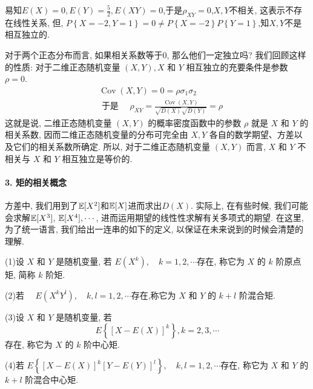 \begin{solution}
    易知$E\left(X\right) = 0,E\left(Y\right) = \frac{5}{2},E\left(X Y\right) = 0$,于是$\rho_{X Y} = 0$,$X,Y$不相关, 这表示不存在线性关系, 但, $P\left\{X = -2,Y = 1\right\} = 0 \neq P\left\{ X = -2\right\}P\left\{Y = 1\right\}$,知$X,Y$不是相互独立的. 
\end{solution}

\begin{example}
    对于两个正态分布而言, 如果相关系数等于0, 那么他们一定独立吗? 我们回顾这样的性质: 对于二维正态随机变量 $(X, Y), X$ 和 $Y$ 相互独立的充要条件是参数 $\rho=0$.$$
    \begin{aligned}
    & \operatorname{Cov}(X, Y)=0=\rho \sigma_1 \sigma_2 \\
    & \text { 于是 } \quad \rho_{X Y}=\frac{\operatorname{Cov}(X, Y)}{\sqrt{D(X)} \sqrt{D(Y)}}=\rho
    \end{aligned}
    $$
    这就是说, 二维正态随机变量 $(X, Y)$ 的概率密度函数中的参数 $\rho$ 就是 $X$ 和 $Y$ 的相关系数, 因而二维正态随机变量的分布可完全由 $X, Y$ 各自的数学期望、方差以及它们的相关系数所确定. 所以, 对于二维正态随机变量 $(X, Y)$ 而言, $X$ 和 $Y$ 不相关与 $X$ 和 $Y$ 相互独立是等价的. 
\end{example}

\paragraph{3. 矩的相关概念} 方差中, 我们用到了$\mathbb E[X^2]$和$\mathbb E[X]$进而求出$D(X)$. 实际上, 在有些时候, 我们可能会求解$\mathbb E[X^3]$, $\mathbb E[X^4],\cdots$, 进而运用期望的线性性求解有关多项式的期望. 在这里, 为了统一语言, 我们给出一连串的如下的定义, 以保证在未来说到的时候会清楚的理解. 

\begin{definition}

    (1)设 $X$ 和 $Y$ 是随机变量, 若
    $
    E\left(X^k\right), \quad k=1,2, \cdots
    $存在, 称它为 $X$ 的 $k$ 阶原点矩, 简称 $k$ 阶矩.

    (2)若 $\quad E\left(X^k Y^l\right), \quad k, l=1,2, \cdots$存在,称它为 $X$ 和 $Y$ 的 $k+l$ 阶混合矩.

    (3)设 $X$ 和 $Y$ 是随机变量, 
        若 $$ E\left\{[X-E(X)]^k\right\}, k=2,3, \cdots$$存在, 称它为 $X$ 的 $k$ 阶中心矩.

     (4)若 $E\left\{[X-E(X)]^k[Y-E(Y)]^{l}\right\}, \quad k, l=1,2, \cdots$存在, 称它为 $X$ 和 $Y$ 的 $k+l$ 阶混合中心矩.
\end{definition}